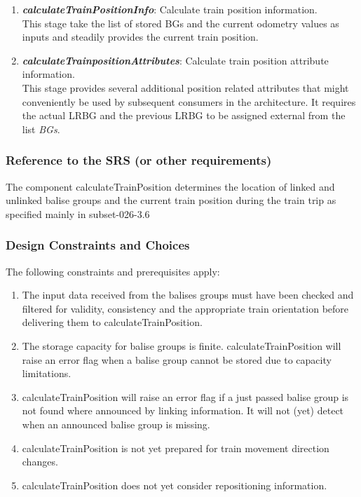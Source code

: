 \begin{enumerate}
\item \textbf{\textit{calculateTrainPositionInfo}}: Calculate train position information.\\
This stage take the list of stored BGs and the current odometry values as inputs and steadily provides the current train position. 

\item \textbf{\textit{calculateTrainpositionAttributes}}: Calculate train position attribute information.\\
This stage provides several additional position related attributes that might conveniently be used by subsequent consumers in the architecture. It requires the actual LRBG and the previous LRBG to be assigned external from the list \textit{BGs}. 
\end{enumerate}

\subsubsection{Reference to the SRS (or other requirements)}
The component calculateTrainPosition determines the location of linked and unlinked balise groups and the current train position during the train trip as specified mainly in subset-026-3.6

\subsubsection{Design Constraints and Choices}
The following constraints and prerequisites apply:
\begin{enumerate}
\item The input data received from the balises groups must have been checked and filtered for validity, consistency and the appropriate train orientation before delivering them to calculateTrainPosition. 
\item The storage capacity for balise groups is finite. calculateTrainPosition will raise an error flag when a balise group cannot be stored due to capacity limitations.
\item calculateTrainPosition will raise an error flag if a just passed balise group is not found where announced by linking information. It will not (yet) detect when an announced balise group is missing. 
\item calculateTrainPosition is not yet prepared for train movement direction changes. 
\item calculateTrainPosition does not yet consider repositioning information.
\end{enumerate}



